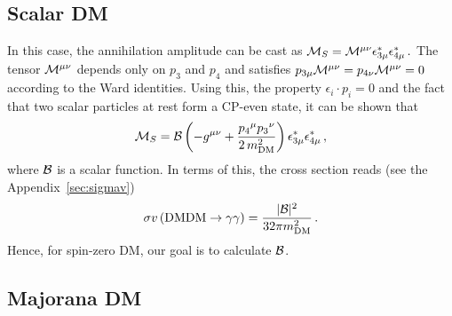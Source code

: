 \subsection{Scalar DM}

In this case, the annihilation amplitude can be cast as
$
{\cal M }_S= {\cal M}^{\mu\nu} \epsilon_{3\mu}^* \epsilon_{4\mu}^*\,.
$
The tensor ${\cal M}^{\mu\nu}$ depends only on $p_3$ and $p_4$ and satisfies $p_{3\mu} {\cal M}^{\mu\nu} = p_{4\nu} {\cal M}^{\mu\nu} =0$ according to the Ward identities. Using this, the property $\epsilon_i\cdot p_i =0$ and the fact that two scalar particles at rest form a CP-even state, 
it can be shown  that  
%
\begin{equation}
  {\cal M}_S ={\cal B} \left( -g^{\mu\nu} + \frac{{p_4}^{\mu} {p_3}^{\nu}}{2\,m_{\text{DM}}^2} \right) \epsilon_{3\mu}^* \epsilon_{4\mu}^*
\,,
\label{eq:Mscalar}
\end{equation}
%
where $\cal B$ is a  scalar function. In terms of this, the cross section reads (see the Appendix~\ref{sec:sigmav})
\begin{equation}
\sigma v \left(\text{DM}\text{DM} \to \gamma\gamma\right) = \frac{|{\cal B}|^2}{32\pi m_{\text{DM}}^2}\,.
\label{eq:cross}
\end{equation}
Hence, for spin-zero DM, our goal is to calculate $\cal B$.






\subsection{Majorana DM}

